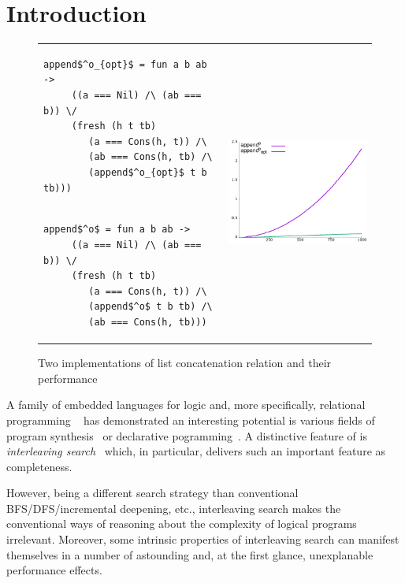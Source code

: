 \section{Introduction}
\label{sec:intro}

\begin{figure}[t]
\begin{tabular}{p{6cm}p{6cm}}
\begin{lstlisting}[basicstyle=\small]
   append$^o_{opt}$ = fun a b ab ->
     ((a === Nil) /\ (ab === b)) \/
     (fresh (h t tb)
        (a === Cons(h, t)) /\
        (ab === Cons(h, tb) /\
        (append$^o_{opt}$ t b tb)))
\end{lstlisting} & \multirow{2}{*}[-3mm]{\includegraphics[width=6cm,height=5cm]{append_without_oc.png}} \\[-9mm]
\begin{lstlisting}[basicstyle=\small]
   append$^o$ = fun a b ab ->
     ((a === Nil) /\ (ab === b)) \/
     (fresh (h t tb)
        (a === Cons(h, t)) /\
        (append$^o$ t b tb) /\
        (ab === Cons(h, tb)))
\end{lstlisting} &
\end{tabular}
\caption{Two implementations of list concatenation relation and their performance}
\label{fig:length_implementations}
\end{figure}

A family of embedded languages for logic and, more specifically, relational programming \mK~\cite{TRS} has demonstrated an interesting potential is various fields of 
program synthesis~\cite{SevenProblems,Twines,Matching} or declarative pogramming~\cite{?}. A distinctive feature of \mK is \emph{interleaving search}~\cite{Transformers} which,
in particular, delivers such an important feature as completeness.

However, being a different search strategy than conventional BFS/DFS/incremental deepening, etc., interleaving search makes the conventional ways of reasoning about the complexity
of logical programs irrelevant. Moreover, some intrinsic properties of interleaving search can manifest themselves in a number of astounding and, at the first glance, unexplanable
performance effects. 

